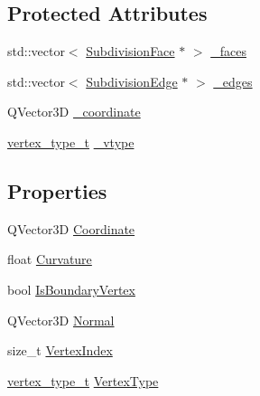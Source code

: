 \subsection*{Protected Attributes}
\begin{DoxyCompactItemize}
\item 
std\-::vector$<$ \hyperlink{classShipCADGeometry_1_1SubdivisionFace}{Subdivision\-Face} $\ast$ $>$ \hyperlink{classShipCADGeometry_1_1SubdivisionPoint_aa6e398141f2b296763548ecdf904d200}{\-\_\-faces}
\item 
std\-::vector$<$ \hyperlink{classShipCADGeometry_1_1SubdivisionEdge}{Subdivision\-Edge} $\ast$ $>$ \hyperlink{classShipCADGeometry_1_1SubdivisionPoint_a1ee85e0a7815d8d737dcd6f654bf15a5}{\-\_\-edges}
\item 
Q\-Vector3\-D \hyperlink{classShipCADGeometry_1_1SubdivisionPoint_a7150fdf34fce9bc242b2266313c1c313}{\-\_\-coordinate}
\item 
\hyperlink{classShipCADGeometry_1_1SubdivisionPoint_a03df9289cd8543cd3a567fa6c8e44c43}{vertex\-\_\-type\-\_\-t} \hyperlink{classShipCADGeometry_1_1SubdivisionPoint_a9ffc795a56a1b963ba29725be17be266}{\-\_\-vtype}
\end{DoxyCompactItemize}
\subsection*{Properties}
\begin{DoxyCompactItemize}
\item 
Q\-Vector3\-D \hyperlink{classShipCADGeometry_1_1SubdivisionPoint_a4a8b002061482e596fb9228a8968cd57}{Coordinate}
\item 
float \hyperlink{classShipCADGeometry_1_1SubdivisionPoint_a7ca022ae7a31b478234ee212a24e3047}{Curvature}
\item 
bool \hyperlink{classShipCADGeometry_1_1SubdivisionPoint_af9d5dfd7c9c8bea01aab36388f0f0afe}{Is\-Boundary\-Vertex}
\item 
Q\-Vector3\-D \hyperlink{classShipCADGeometry_1_1SubdivisionPoint_a547c0cb9b9641fcb9d6a5beb3a86d59c}{Normal}
\item 
size\-\_\-t \hyperlink{classShipCADGeometry_1_1SubdivisionPoint_a3603dcd95c922b3852e0ba6f95a08b7f}{Vertex\-Index}
\item 
\hyperlink{classShipCADGeometry_1_1SubdivisionPoint_a03df9289cd8543cd3a567fa6c8e44c43}{vertex\-\_\-type\-\_\-t} \hyperlink{classShipCADGeometry_1_1SubdivisionPoint_a194e5f0d73d3af0bd21fa3cd4fa03296}{Vertex\-Type}
\end{DoxyCompactItemize}


